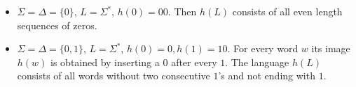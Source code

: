 

\setcounter{section}{3}
\setcounter{subsection}{3}
\setcounter{dfn}{10}

\begin{exl}
\begin{itemize}
\item
$\Sigma = \Delta = \{0\}$, $L = \Sigma^*$, $h(0) = 00$. Then $h(L)$ consists of all even length sequences of zeros.
\item
$\Sigma = \Delta = \{0, 1\}$, $L = \Sigma^*$, $h(0) = 0, h(1) = 10$. For every word $w$ its image $h(w)$ is obtained by inserting a $0$ after every $1$.
The language $h(L)$ consists of all words without two consecutive $1$'s and not ending with $1$.
\end{itemize}
\end{exl}


